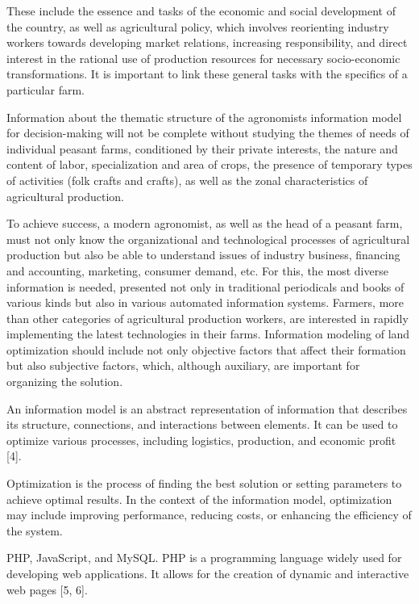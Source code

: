 These include the essence and tasks of the economic and social
development of the country, as well as agricultural policy, which
involves reorienting industry workers towards developing market
relations, increasing responsibility, and direct interest in the
rational use of production resources for necessary socio-economic
transformations. It is important to link these general tasks with the
specifics of a particular farm.

Information about the thematic structure of the
agronomists\textquotesingle{} information model for decision-making will
not be complete without studying the themes of needs of individual
peasant farms, conditioned by their private interests, the nature and
content of labor, specialization and area of crops, the presence of
temporary types of activities (folk crafts and crafts), as well as the
zonal characteristics of agricultural production.

To achieve success, a modern agronomist, as well as the head of a
peasant farm, must not only know the organizational and technological
processes of agricultural production but also be able to understand
issues of industry business, financing and accounting, marketing,
consumer demand, etc. For this, the most diverse information is needed,
presented not only in traditional periodicals and books of various kinds
but also in various automated information systems. Farmers, more than
other categories of agricultural production workers, are interested in
rapidly implementing the latest technologies in their farms. Information
modeling of land optimization should include not only objective factors
that affect their formation but also subjective factors, which, although
auxiliary, are important for organizing the solution.

An information model is an abstract representation of information that
describes its structure, connections, and interactions between elements.
It can be used to optimize various processes, including logistics,
production, and economic profit {[}4{]}.

Optimization is the process of finding the best solution or setting
parameters to achieve optimal results. In the context of the information
model, optimization may include improving performance, reducing costs,
or enhancing the efficiency of the system.

PHP, JavaScript, and MySQL. PHP is a programming language widely used
for developing web applications. It allows for the creation of dynamic
and interactive web pages {[}5, 6{]}.

